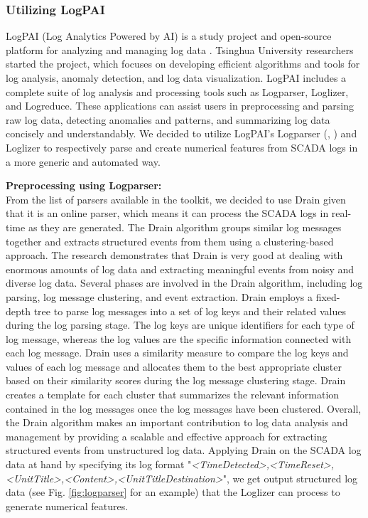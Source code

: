   \subsubsection{Utilizing LogPAI}
    LogPAI (Log Analytics Powered by AI) is a study project and open-source platform for analyzing and managing log data \cite{LogPAI}. 
    Tsinghua University researchers started the project, which focuses on developing efficient algorithms and tools for log analysis, anomaly detection, and log data visualization.
    LogPAI includes a complete suite of log analysis and processing tools such as Logparser, Loglizer, and Logreduce. 
    These applications can assist users in preprocessing and parsing raw log data, detecting anomalies and patterns, and summarizing log data concisely and understandably.
    We decided to utilize LogPAI's Logparser (\cite{Logparser_1}, \cite{Logparser_2}) and Loglizer \cite{Loglizer} to respectively parse and create numerical features from 
    SCADA logs in a more generic and automated way.\\

    \begin{flushleft}
      \textbf{Preprocessing using Logparser:}\\
      From the list of parsers available in the toolkit, we decided to use Drain \cite{Drain} given that it is an online parser, which means it can process the SCADA logs 
      in real-time as they are generated. The Drain algorithm groups similar log messages together and extracts structured events from them using a 
      clustering-based approach. The research demonstrates that Drain is very good at dealing with enormous amounts of log data and extracting meaningful events from 
      noisy and diverse log data. Several phases are involved in the Drain algorithm, including log parsing, log message clustering, and event extraction. 
      Drain employs a fixed-depth tree to parse log messages into a set of log keys and their related values during the log parsing stage. The log keys 
      are unique identifiers for each type of log message, whereas the log values are the specific information connected with each log message. Drain uses a similarity measure 
      to compare the log keys and values of each log message and allocates them to the best appropriate cluster based on their similarity scores during the log message 
      clustering stage. Drain creates a template for each cluster that summarizes the relevant information contained in the log messages once the log messages have been clustered.
      Overall, the Drain algorithm makes an important contribution to log data analysis and management by providing a scalable and effective approach for extracting structured 
      events from unstructured log data.
      Applying Drain on the SCADA log data at hand by specifying its log format "\emph{<TimeDetected>,<TimeReset>,<UnitTitle>,<Content>,<UnitTitleDestination>}", we get 
      output structured log data (see Fig. \ref{fig:logparser} for an example) that the Loglizer can process to generate numerical features.
    \end{flushleft}

